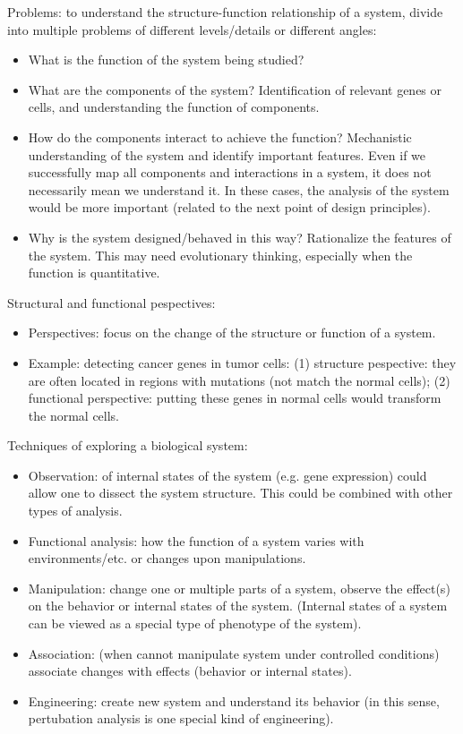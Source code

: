 \documentclass{report}
\begin{document}
Problems: to understand the structure-function relationship of a system, divide into multiple problems of different levels/details or different angles: 
\begin{itemize}
\item What is the function of the system being studied? 
\item What are the components of the system? Identification of relevant genes or cells, and understanding the function of components. 
\item How do the components interact to achieve the function? Mechanistic understanding of the system and identify important features. Even if we successfully map all components and interactions in a system, it does not necessarily mean we understand it. In these cases, the analysis of the system would be more important (related to the next point of design principles). 
\item Why is the system designed/behaved in this way? Rationalize the features of the system. This may need evolutionary thinking, especially when the function is quantitative. 
\end{itemize}

Structural and functional pespectives: 
\begin{itemize}
\item Perspectives: focus on the change of the structure or function of a system.
\item Example: detecting cancer genes in tumor cells: (1) structure pespective: they are often located in regions with mutations (not match the normal cells); (2) functional perspective: putting these genes in normal cells would transform the normal cells. 
\end{itemize}
 
Techniques of exploring a biological system: 
\begin{itemize}
	\item Observation: of internal states of the system (e.g. gene expression) could allow one to dissect the system structure. This could be combined with other types of analysis. 
	\item Functional analysis: how the function of a system varies with environments/etc. or changes upon manipulations. 
	\item Manipulation: change one or multiple parts of a system, observe the effect(s) on the behavior or internal states of the system. (Internal states of a system can be viewed as a special type of phenotype of the system). 
	\item Association: (when cannot manipulate system under controlled conditions) associate changes with effects (behavior or internal states). 
	\item Engineering: create new system and understand its behavior (in this sense, pertubation analysis is one special kind of engineering). 
\end{itemize}
\end{document}
